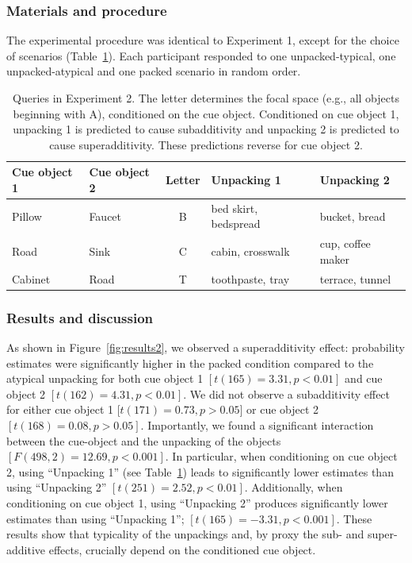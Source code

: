 \subsubsection{Materials and procedure}
The experimental procedure was identical to Experiment 1, except for the choice of scenarios (Table~\ref{tab:scenarios2}). Each participant responded to one unpacked-typical, one unpacked-atypical and one packed scenario in random order.

\begin{table}[htbp]
\caption{Queries in Experiment 2. The letter determines the focal space (e.g., all objects beginning with A), conditioned on the cue object. Conditioned on cue object 1, unpacking 1 is predicted to cause subadditivity and unpacking 2 is predicted to cause superadditivity. These predictions reverse for cue object 2.}
\label{tab:scenarios2}
\centering
\begin{tabular}{l|l|c|l|l}
\bf{Cue object 1}&\bf{Cue object 2}&\bf{Letter}&\bf{Unpacking 1} &\bf{Unpacking 2}\\\hline
Pillow & Faucet & B & bed skirt, bedspread\ & bucket, bread\\
Road & Sink & C & cabin, crosswalk & cup, coffee maker\\
Cabinet & Road & T & toothpaste, tray & terrace, tunnel
\end{tabular}
\end{table}

\subsubsection{Results and discussion}
As shown in Figure~\ref{fig:results2}, we observed a superadditivity effect: probability estimates were significantly higher in the packed condition compared to the atypical unpacking for both cue object 1 $[t(165)=3.31, p<0.01]$ and cue object 2 $[t(162)=4.31, p<0.01]$. We did not observe a subadditivity effect for either cue object 1 [$t(171)=0.73, p>0.05]$ or cue object 2 $[t(168)=0.08, p>0.05]$. Importantly, we found a significant interaction between the cue-object and the unpacking of the objects $[F(498, 2)=12.69, p<0.001]$. In particular, when conditioning on cue object 2, using ``Unpacking 1'' (see Table~\ref{tab:scenarios2}) leads to significantly lower estimates than using ``Unpacking 2'' $[t(251)=2.52 , p<0.01]$. Additionally, when conditioning on cue object 1, using ``Unpacking 2'' produces significantly lower estimates than using ``Unpacking 1''; $[t(165)=-3.31, p<0.001]$. These results show that typicality of the unpackings and, by proxy the sub- and super-additive effects, crucially depend on the conditioned cue object.

